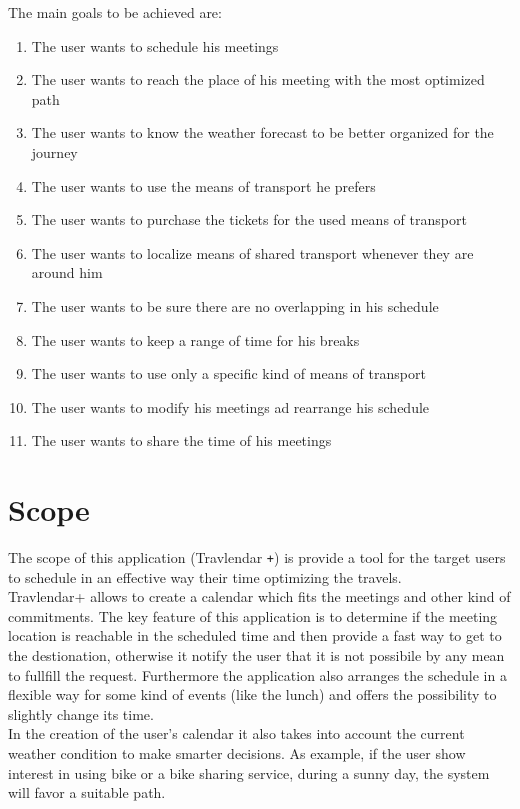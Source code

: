\documentclass[numbers=noenddot, 12pt, a4paper, oneside]{scrbook}
\def\Plus{\texttt{+}}
\begin{document}
The main goals to be achieved are:
\begin{enumerate}
	\item The user wants to schedule his meetings
	\item The user wants to reach the place of his meeting with the most optimized path
	\item The user wants to know the weather forecast to be better organized for the journey
	\item The user wants to use the means of transport he prefers
	\item The user wants to purchase the tickets for the used means of transport 
	\item The user wants to localize means of shared transport whenever they are around him
	\item The user wants to be sure there are no overlapping in his schedule
	\item The user wants to keep a range of time for his breaks
	\item The user wants to use only a specific kind of means of transport
	\item The user wants to modify his meetings ad rearrange his schedule 
	\item The user wants to share the time of his meetings
\end{enumerate}

\section{Scope}

The scope of this application (Travlendar \Plus) is provide a tool for the target users to schedule in an effective way their time optimizing the travels.\\

Travlendar+ allows to create a calendar which fits the meetings and other kind of commitments.
The key feature of this application is to determine if the meeting location is reachable in the scheduled time and then provide a fast way to get to the destionation, otherwise it notify the user that it is not possibile by any mean to fullfill the request. Furthermore the application also arranges the schedule in a flexible way for some kind of events (like the lunch) and offers the possibility to slightly change its time.\\

In the creation of the user's calendar it also takes into account the current weather condition to make smarter decisions. As example, if the user show interest in using bike or a bike sharing service, during a sunny day, the system will favor a suitable path.\\
\end{document}
